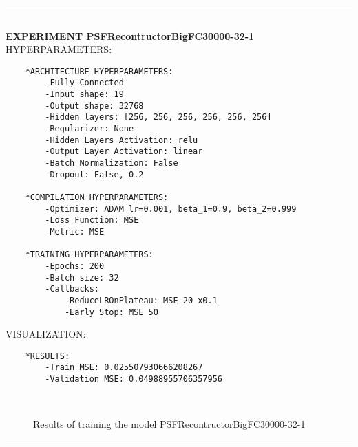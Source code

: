\rule{0.5\textwidth}{0.5pt}\\

	{\large \textbf{EXPERIMENT PSFRecontructorBigFC30000-32-1}}\\
	
	{\normalsize HYPERPARAMETERS:}
	\begin{lstlisting}	
	*ARCHITECTURE HYPERPARAMETERS:
		-Fully Connected
		-Input shape: 19
		-Output shape: 32768
		-Hidden layers: [256, 256, 256, 256, 256, 256]
		-Regularizer: None
		-Hidden Layers Activation: relu
		-Output Layer Activation: linear
		-Batch Normalization: False
		-Dropout: False, 0.2
	
	*COMPILATION HYPERPARAMETERS:
		-Optimizer: ADAM lr=0.001, beta_1=0.9, beta_2=0.999
		-Loss Function: MSE
		-Metric: MSE
	
	*TRAINING HYPERPARAMETERS:
		-Epochs: 200
		-Batch size: 32
		-Callbacks: 
			-ReduceLROnPlateau: MSE 20 x0.1
			-Early Stop: MSE 50
	\end{lstlisting}
	
	{\normalsize VISUALIZATION:}
	\begin{lstlisting}
	*RESULTS:
        -Train MSE: 0.025507930666208267
        -Validation MSE: 0.04988955706357956
	\end{lstlisting}
	
	\begin{figure*}[ht!]
		\hspace{\fill}
		\hspace{\fill}
		\\
		\caption{Results of training the model PSFRecontructorBigFC30000-32-1}
	\end{figure*}
	
\FloatBarrier	
\rule{0.5\textwidth}{0.5pt}\\